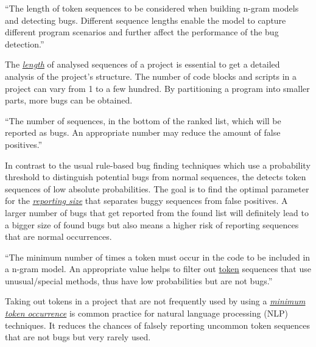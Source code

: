 \begin{definition}\label{def:sequence_length}
    ``The length of token sequences to be considered when building n-gram models and detecting bugs. Different sequence lengths enable the model to capture different program scenarios and further affect the performance of the bug detection.''~\cite{bugram}
\end{definition}

The \hyperref[def:sequence_length]{\textit{length}} of analysed sequences of a project is essential to get a detailed analysis of the project's structure. The number of code blocks and scripts in a \scratch{} project can vary from 1 to a few hundred. By partitioning a program into smaller parts, more bugs can be obtained.

\begin{definition}\label{def:reporting_size}
    ``The number of sequences, in the bottom of the ranked list, which will be reported as bugs. An appropriate number may reduce the amount of false positives.''~\cite{bugram}
\end{definition}

In contrast to the usual rule-based bug finding techniques which use a probability threshold to distinguish potential bugs from normal sequences, the \ngram{} detects token sequences of low absolute probabilities. The goal is to find the optimal parameter for the \hyperref[def:reporting_size]{\textit{reporting size}} that separates buggy sequences from false positives. A larger number of bugs that get reported from the found list will definitely lead to a bigger size of found bugs but also means a higher risk of reporting sequences that are normal occurrences.

\begin{definition}\label{def:minimum_token_occurrence}
    ``The minimum number of times a token must occur in the code to be included in a n-gram model. An appropriate value helps to filter out \hyperref[def:token]{token} sequences that use unusual/special methods, thus have low probabilities but are not bugs.''~\cite{bugram}
\end{definition}

Taking out tokens in a project that are not frequently used by using a \hyperref[def:minimum_token_occurrence]{\textit{minimum token occurrence}} is common practice for natural language processing (NLP) techniques. It reduces the chances of falsely reporting uncommon token sequences that are not bugs but very rarely used. 

